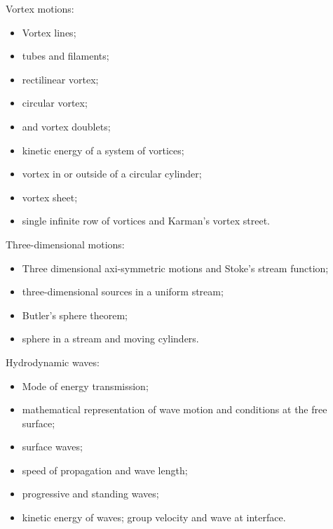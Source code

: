 \documentclass[12pt,class=book,crop=false]{standalone}
\begin{document}
Vortex motions:
\begin{itemize}[noitemsep]
    \item Vortex lines;
    \item tubes and filaments;
    \item rectilinear vortex;
    \item circular vortex;
    \item and vortex doublets;
    \item kinetic energy of a system of vortices;
    \item vortex in or outside of a circular cylinder;
    \item vortex sheet;
    \item single infinite row of vortices and Karman's vortex street.
\end{itemize}
Three-dimensional motions:
\begin{itemize}[noitemsep]
    \item Three dimensional axi-symmetric motions and Stoke's stream function;
    \item three-dimensional sources in a uniform stream;
    \item Butler's sphere theorem;
    \item sphere in a stream and moving cylinders.
\end{itemize}
Hydrodynamic waves:
\begin{itemize}[noitemsep]
    \item Mode of energy transmission;
    \item mathematical representation of wave motion and conditions at the free surface;
    \item surface waves;
    \item speed of propagation and wave length;
    \item progressive and standing waves;
    \item kinetic energy of waves; group velocity and wave at interface.
\end{itemize}
\end{document}

